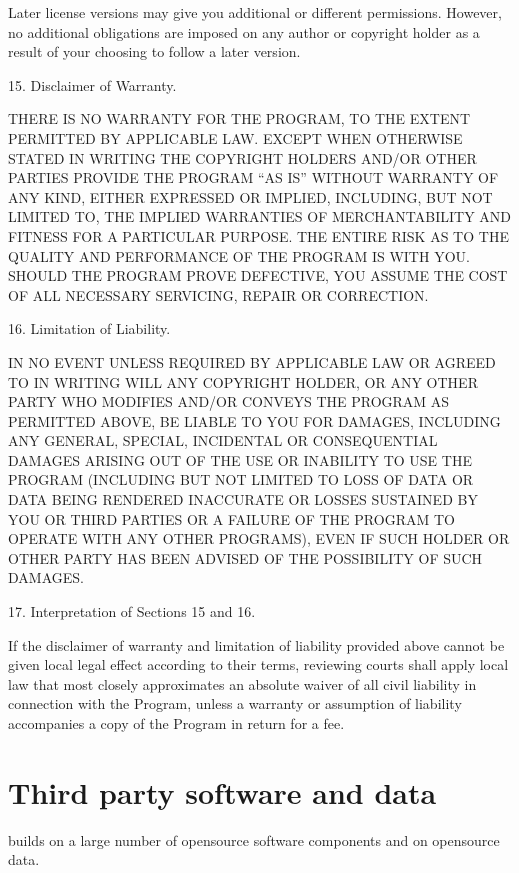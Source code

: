 \documentclass[letterpaper,10pt,english]{sphinxmanual}
\begin{document}
\begin{sphinxVerbatim}[commandchars=\\\{\}]
   Later license versions may give you additional or different
   permissions. However, no additional obligations are imposed on any author or
   copyright holder as a result of your choosing to follow a later version.

 15. Disclaimer of Warranty.

   THERE IS NO WARRANTY FOR THE PROGRAM, TO THE EXTENT PERMITTED BY APPLICABLE
   LAW. EXCEPT WHEN OTHERWISE STATED IN WRITING THE COPYRIGHT HOLDERS AND/OR
   OTHER PARTIES PROVIDE THE PROGRAM “AS IS” WITHOUT WARRANTY OF ANY KIND,
   EITHER EXPRESSED OR IMPLIED, INCLUDING, BUT NOT LIMITED TO, THE IMPLIED
   WARRANTIES OF MERCHANTABILITY AND FITNESS FOR A PARTICULAR PURPOSE. THE
   ENTIRE RISK AS TO THE QUALITY AND PERFORMANCE OF THE PROGRAM IS WITH
   YOU. SHOULD THE PROGRAM PROVE DEFECTIVE, YOU ASSUME THE COST OF ALL
   NECESSARY SERVICING, REPAIR OR CORRECTION.

 16. Limitation of Liability.

   IN NO EVENT UNLESS REQUIRED BY APPLICABLE LAW OR AGREED TO IN WRITING WILL
   ANY COPYRIGHT HOLDER, OR ANY OTHER PARTY WHO MODIFIES AND/OR CONVEYS THE
   PROGRAM AS PERMITTED ABOVE, BE LIABLE TO YOU FOR DAMAGES, INCLUDING ANY
   GENERAL, SPECIAL, INCIDENTAL OR CONSEQUENTIAL DAMAGES ARISING OUT OF THE USE
   OR INABILITY TO USE THE PROGRAM (INCLUDING BUT NOT LIMITED TO LOSS OF DATA
   OR DATA BEING RENDERED INACCURATE OR LOSSES SUSTAINED BY YOU OR THIRD
   PARTIES OR A FAILURE OF THE PROGRAM TO OPERATE WITH ANY OTHER PROGRAMS),
   EVEN IF SUCH HOLDER OR OTHER PARTY HAS BEEN ADVISED OF THE POSSIBILITY OF
   SUCH DAMAGES.

 17. Interpretation of Sections 15 and 16.

   If the disclaimer of warranty and limitation of liability provided above
   cannot be given local legal effect according to their terms, reviewing
   courts shall apply local law that most closely approximates an absolute
   waiver of all civil liability in connection with the Program, unless a
   warranty or assumption of liability accompanies a copy of the Program in
   return for a fee.
\end{sphinxVerbatim}


\chapter{Third party software and data}
\label{\detokenize{04-appendix/license_3rdParty:third-party-software-and-data}}\label{\detokenize{04-appendix/license_3rdParty::doc}}
\sphinxAtStartPar
{} builds on a large number of open\sphinxhyphen{}source software
components and on open\sphinxhyphen{}source data.
\end{document}
